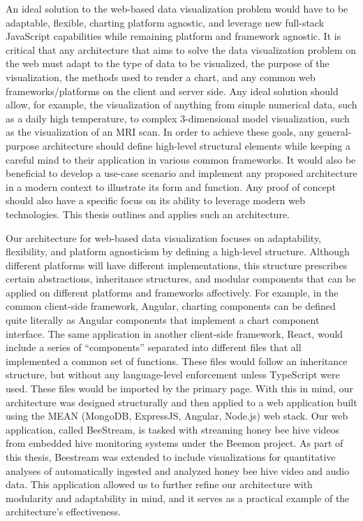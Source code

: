 An ideal solution to the web-based data visualization problem would have to be adaptable, flexible, charting platform agnostic, and leverage new full-stack JavaScript capabilities while remaining platform and framework agnostic.  It is critical that any architecture that aims to solve the data visualization problem on the web must adapt to the type of data to be visualized, the purpose of the visualization, the methods used to render a chart, and any common web frameworks/platforms on the client and server side.  Any ideal solution should allow, for example, the visualization of anything from simple numerical data, such as a daily high temperature, to complex 3-dimensional model visualization, such as the visualization of an MRI scan.  In order to achieve these goals, any general-purpose architecture should define high-level structural elements while keeping a careful mind to their application in various common frameworks.  It would also be beneficial to develop a use-case scenario and implement any proposed architecture in a modern context to illustrate its form and function.  Any proof of concept should also have a specific focus on its ability to leverage modern web technologies.  This thesis outlines and applies such an architecture. \par
Our architecture for web-based data visualization focuses on adaptability, flexibility, and platform agnosticism by defining a high-level structure.  Although different platforms will have different implementations, this structure prescribes certain abstractions, inheritance structures, and modular components that can be applied on different platforms and frameworks affectively.  For example, in the common client-side framework, Angular, charting components can be defined quite literally as Angular components that implement a chart component interface.  The same application in another client-side framework, React, would include a series of “components” separated into different files that all implemented a common set of functions.  These files would follow an inheritance structure, but without any language-level enforcement unless TypeScript were used.  These files would be imported by the primary page.  With this in mind, our architecture was designed structurally and then applied to a web application built using the MEAN (MongoDB, ExpressJS, Angular, Node.js) web stack.  Our web application, called BeeStream, is tasked with streaming honey bee hive videos from embedded hive monitoring systems under the Beemon project.  As part of this thesis, Beestream was extended to include visualizations for quantitative analyses of automatically ingested and analyzed honey bee hive video and audio data.  This application allowed us to further refine our architecture with modularity and adaptability in mind, and it serves as a practical example of the architecture’s effectiveness. \par
